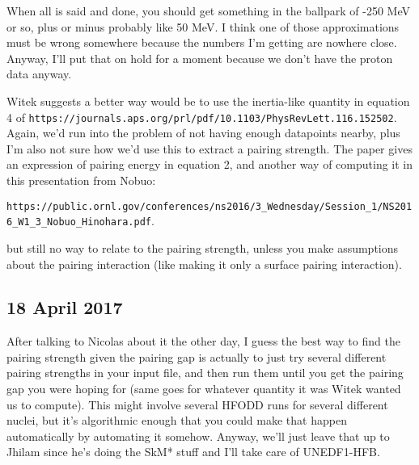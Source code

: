 \documentclass[]{report}
\begin{document}
\noindent When all is said and done, you should get something in the ballpark of -250 MeV or so, plus or minus probably like 50 MeV. I think one of those approximations must be wrong somewhere because the numbers I'm getting are nowhere close. Anyway, I'll put that on hold for a moment because we don't have the proton data anyway.

Witek suggests a better way would be to use the inertia-like quantity in equation 4 of \verb|https://journals.aps.org/prl/pdf/10.1103/PhysRevLett.116.152502|. Again, we'd run into the problem of not having enough datapoints nearby, plus I'm also not sure how we'd use this to extract a pairing strength. The paper gives an expression of pairing energy in equation 2, and another way of computing it in this presentation from Nobuo:

\noindent\verb|https://public.ornl.gov/conferences/ns2016/3_Wednesday/Session_1/NS2016_W1_3_Nobuo_Hinohara.pdf|.

\noindent but still no way to relate to the pairing strength, unless you make assumptions about the pairing interaction (like making it only a surface pairing interaction).

\subsection*{18 April 2017}
After talking to Nicolas about it the other day, I guess the best way to find the pairing strength given the pairing gap is actually to just try several different pairing strengths in your input file, and then run them until you get the pairing gap you were hoping for (same goes for whatever quantity it was Witek wanted us to compute). This might involve several HFODD runs for several different nuclei, but it's algorithmic enough that you could make that happen automatically by automating it somehow. Anyway, we'll just leave that up to Jhilam since he's doing the SkM* stuff and I'll take care of UNEDF1-HFB.
\end{document}
